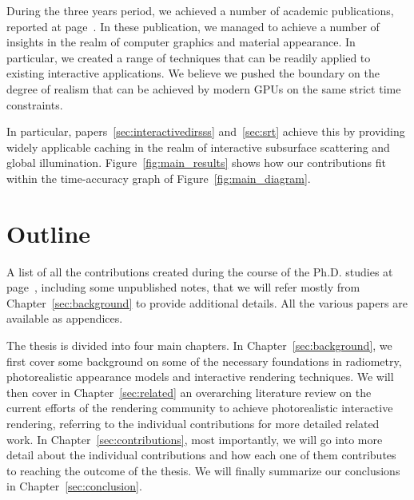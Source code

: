 During the three years period, we achieved a number of academic publications, reported at page~\pageref{sec:contributionlist}. In these publication, we managed to achieve a number of insights in the realm of computer graphics and material appearance. In particular, we created a range of techniques that can be readily applied to existing interactive applications. We believe we pushed the boundary on the degree of realism that can be achieved by modern GPUs on the same strict time constraints. 

In particular, papers~\ref{sec:interactivedirsss} and~\ref{sec:srt} achieve this by providing widely applicable caching in the realm of interactive subsurface scattering and global illumination. Figure~\ref{fig:main_results} shows how our contributions fit within the time-accuracy graph of Figure~\ref{fig:main_diagram}.
\vfill\clearpage
\section{Outline}

A list of all the contributions created during the course of the Ph.D. studies at page~\pageref{sec:contributionlist}, including some unpublished notes, that we will refer mostly from Chapter~\ref{sec:background} to provide additional details. All the various papers are available as appendices. 

The thesis is divided into four main chapters. In Chapter~\ref{sec:background}, we first cover some background on some of the necessary foundations in radiometry, photorealistic appearance models and interactive rendering techniques. We will then cover in Chapter~\ref{sec:related} an overarching literature review on the current efforts of the rendering community to achieve photorealistic interactive rendering, referring to the individual contributions for more detailed related work. In Chapter~\ref{sec:contributions}, most importantly, we will go into more detail about the individual contributions and how each one of them contributes to reaching the outcome of the thesis. We will finally summarize our conclusions in Chapter~\ref{sec:conclusion}. 
